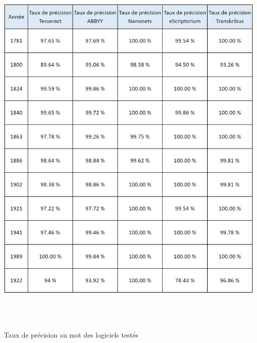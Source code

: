 \documentclass[a4paper,12pt,twoside]{book}
\begin{document}
\begin{table} [H]
\includegraphics[width=6in,height=7.25in]{vertopal_157ae480aa4a4b07be198b586a812241/media/image24.png}
\caption{Taux de précision au mot des logiciels testés}
\end{table}

\newpage{\pagestyle{empty}\cleardoublepage}


\backmatter %

\listoftables
\listoffigures
\tableofcontents
\end{document}
